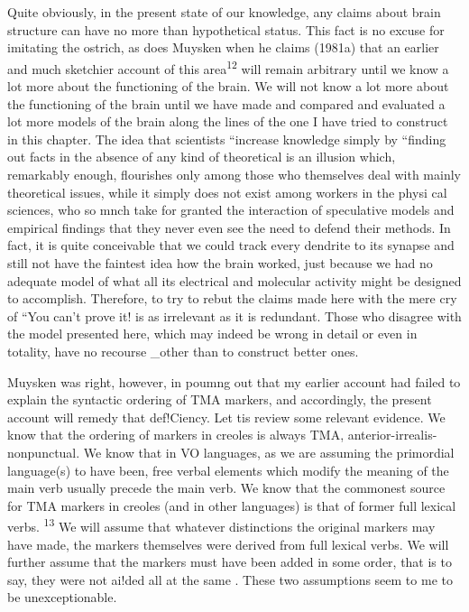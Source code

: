 Quite obviously, in the present state of our knowledge, any claims about brain structure can have no more than hypothetical status. This fact is no excuse for imitating the ostrich, as does Muysken when he claims (1981a) that an earlier and much sketchier account of this area\textsuperscript{12} {\textquotedbl}will remain arbitrary until we know a lot more about the functioning of the brain. We will not know a lot more about the functioning of the brain until we have made and compared and evalu\-ated a lot more models of the brain along the lines of the one I have tried to construct in this chapter. The idea that scientists ``increase knowledge simply by ``finding out facts in the absence of any kind of theoretical  is an illusion which, remarkably enough, flourishes only among those who themselves deal with mainly theore\-tical issues, while it simply does not exist among workers in the physi cal sciences, who so mnch take for granted the interaction of specula\-tive models and empirical findings that they never even see the need to defend their methods. In fact, it is quite conceivable that we could track every dendrite to its synapse and still not have the faintest idea
how the brain worked, just because we had no adequate model of what all its electrical and molecular activity might be designed to accomplish. Therefore, to try to rebut the claims made here with the mere cry of ``You can't prove it! is as irrelevant as it is redundant. Those who disagree with the model presented here, which may indeed be wrong
in detail or even in totality, have no recourse \_other than to construct better ones.

Muysken was right, however, in poumng out that my earlier account had failed to explain the syntactic ordering of TMA markers, and accordingly, the present account will remedy that def!Ciency. Let tis review some relevant evidence. We know that the ordering of mark\-ers in creoles is always TMA, anterior-irrealis-nonpunctual. We know
that in VO languages, as we are assuming the primordial language(s) to have been, free verbal elements which modify the meaning of the main verb usually precede the main verb. We know that the commonest source for TMA markers in creoles (and in other languages) is that of former full lexical verbs. \textsuperscript{13} We will assume that whatever distinctions the original markers may have made, the markers themselves were
derived from full lexical verbs. We will further assume that the markers
must have been added in some order, that is to say, they were not ai!ded all at the same . These two assumptions seem to me to be unexceptionable.


